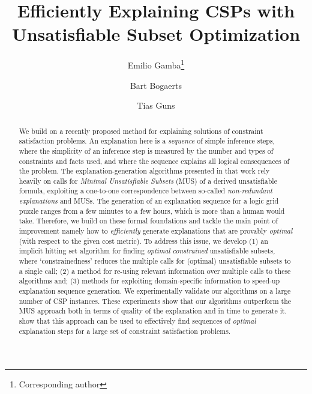 \documentclass[a4paper,UKenglish,cleveref, autoref, thm-restate, pdfa]{lipics-v2021}
\title{Efficiently Explaining CSPs with Unsatisfiable Subset Optimization}
\author{Emilio Gamba\footnote{Corresponding author}}{Data Analytics Lab, Vrije Universiteit Brussel, Belgium}{emilio.gamba@vub.be}{https://orcid.org/0000-0003-1720-9428}{}
\author{Bart Bogaerts}{Artificial Intelligence Lab, Vrije Universiteit Brussel, Belgium \and \url{https://www.bartbogaerts.eu}}{bart.bogaerts@vub.be}{https://orcid.org/0000-0003-3460-4251}{}
\author{Tias Guns}{Data Analytics Lab, Vrije Universiteit Brussel, Belgium \and DTAI, KULeuven, Belgium \and \url{https://people.cs.kuleuven.be/~tias.guns/}}{tias.guns@kuleuven.be}{https://orcid.org/0000-0002-2156-2155}{}
\begin{document}
\maketitle

\begin{abstract}
 We build on a recently proposed method for explaining solutions of constraint satisfaction problems.
 An explanation here is a \textit{sequence} of simple inference steps, where the simplicity of an inference step is measured by the number and types of constraints and facts used, and where the sequence explains all logical consequences of the problem. 
 The explanation-generation algorithms presented in that work rely heavily on calls for \emph{Minimal Unsatisfiable Subsets} (MUS) \cite{marques2010minimal} of a derived unsatisfiable formula, exploiting a one-to-one correspondence between so-called \emph{non-redundant explanations} and MUSs. The generation of an explanation sequence for a logic grid puzzle ranges from a few minutes to a few hours, which is more than a human would take.
 Therefore, we build on these formal foundations and tackle the main point of improvement 
 namely how to \emph{efficiently} generate explanations that are provably \emph{optimal} (with respect to the given cost metric). 
 To address this issue, we develop (1) an implicit hitting set algorithm for finding \emph{optimal} \emph{constrained} unsatisfiable subsets, where `constrainedness' reduces the multiple calls for (optimal) unsatisfiable subsets to a single call; (2) a method for re-using relevant information over multiple calls to these algorithms and; (3) methods for exploiting domain-specific information to speed-up explanation sequence generation.
We experimentally validate our algorithms on a large number of CSP instances. These experiments show that our algorithms outperform the MUS approach both in terms of quality of the explanation and in time to generate it. 
show that this approach can be used to effectively find sequences of \textit{optimal} explanation steps for a large set of constraint satisfaction problems.
\end{abstract}
\end{document}
